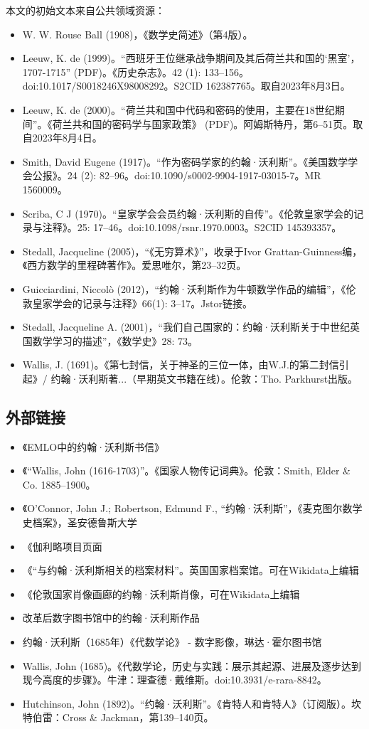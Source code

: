 本文的初始文本来自公共领域资源：

\begin{itemize}
\item W. W. Rouse Ball (1908)，《数学史简述》（第4版）。
\item Leeuw, K. de (1999)。“西班牙王位继承战争期间及其后荷兰共和国的‘黑室’，1707-1715” (PDF)。《历史杂志》。42 (1): 133–156。doi:10.1017/S0018246X98008292。S2CID 162387765。取自2023年8月3日。
\item Leeuw, K. de (2000)。“荷兰共和国中代码和密码的使用，主要在18世纪期间”。《荷兰共和国的密码学与国家政策》 (PDF)。阿姆斯特丹，第6–51页。取自2023年8月4日。
\item Smith, David Eugene (1917)。“作为密码学家的约翰·沃利斯”。《美国数学学会公报》。24 (2): 82–96。doi:10.1090/s0002-9904-1917-03015-7。MR 1560009。
\item Scriba, C J (1970)。“皇家学会会员约翰·沃利斯的自传”。《伦敦皇家学会的记录与注释》。25: 17–46。doi:10.1098/rsnr.1970.0003。S2CID 145393357。
\item Stedall, Jacqueline (2005)，“《无穷算术》”，收录于Ivor Grattan-Guinness编，《西方数学的里程碑著作》。爱思唯尔，第23–32页。
\item Guicciardini, Niccolò (2012)，“约翰·沃利斯作为牛顿数学作品的编辑”，《伦敦皇家学会的记录与注释》66(1): 3–17。Jstor链接。
\item Stedall, Jacqueline A. (2001)，“我们自己国家的：约翰·沃利斯关于中世纪英国数学学习的描述”，《数学史》28: 73。
\item Wallis, J. (1691)。《第七封信，关于神圣的三位一体，由W.J.的第二封信引起》/ 约翰·沃利斯著...（早期英文书籍在线）。伦敦：Tho. Parkhurst出版。
\end{itemize}
\subsection{外部链接}
\begin{itemize}
\item 《EMLO中的约翰·沃利斯书信》
\item 《“Wallis, John (1616-1703)”。《国家人物传记词典》。伦敦：Smith, Elder & Co. 1885–1900。
\item 《O'Connor, John J.; Robertson, Edmund F., “约翰·沃利斯”，《麦克图尔数学史档案》，圣安德鲁斯大学
\item 《伽利略项目页面
\item 《“与约翰·沃利斯相关的档案材料”。英国国家档案馆。可在Wikidata上编辑
\item 《伦敦国家肖像画廊的约翰·沃利斯肖像，可在Wikidata上编辑
\item 改革后数字图书馆中的约翰·沃利斯作品
\item 约翰·沃利斯（1685年）《代数学论》 - 数字影像，琳达·霍尔图书馆
\item Wallis, John (1685)。《代数学论，历史与实践：展示其起源、进展及逐步达到现今高度的步骤》。牛津：理查德·戴维斯。doi:10.3931/e-rara-8842。
\item Hutchinson, John (1892)。“约翰·沃利斯”。《肯特人和肯特人》（订阅版）。坎特伯雷：Cross & Jackman，第139–140页。
\end{itemize}